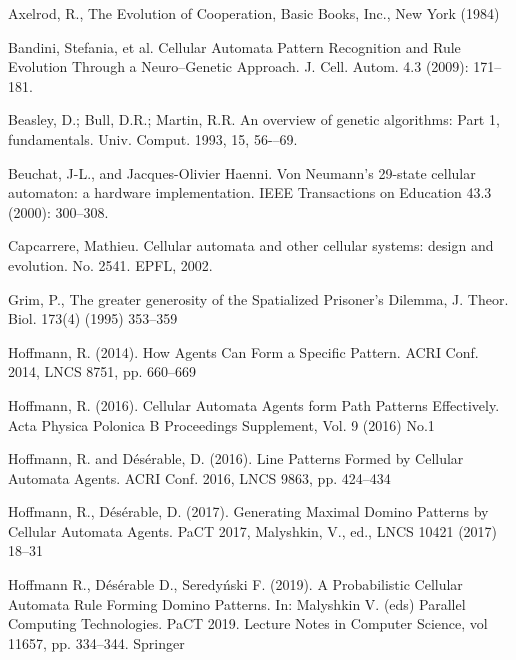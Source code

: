 \documentclass[10pt,a4paper]{article}  %
\begin{document}
\begin{thebibliography}{99}
\footnotesize
{}
Axelrod, R., The Evolution of Cooperation, Basic Books, Inc., New York (1984)

Bandini, Stefania, et al. 
Cellular Automata Pattern Recognition and Rule Evolution Through a Neuro--Genetic Approach.
J. Cell. Autom. 4.3 (2009): 171--181.


Beasley, D.; Bull, D.R.; Martin, R.R. An overview of genetic algorithms: Part 1, fundamentals. Univ. Comput. 1993, 15, 56-–69.

Beuchat, J-L., and Jacques-Olivier Haenni. 
Von Neumann's 29-state cellular automaton: a hardware implementation.
 IEEE Transactions on Education 43.3 (2000): 300--308.

Capcarrere, Mathieu. 
Cellular automata and other cellular systems: design and evolution. No. 2541. EPFL, 2002.

Grim, P., The greater generosity of the Spatialized Prisoner’s Dilemma, J. Theor.
Biol. 173(4) (1995) 353--359

Hoffmann, R. 
(2014).
How Agents Can Form a Specific Pattern.
ACRI Conf. 2014, LNCS 8751, pp. 660--669

Hoffmann, R. 
(2016).
Cellular Automata Agents form Path Patterns Effectively.
Acta Physica Polonica B Proceedings Supplement, Vol. 9 (2016) No.1


Hoffmann, R. and  D{\'e}s{\'e}rable, D.
(2016).
Line Patterns Formed by Cellular Automata Agents.
ACRI Conf. 2016, LNCS 9863, pp. 424--434

Hoffmann, R., D{\'e}s{\'e}rable, D.
(2017).
Generating Maximal Domino Patterns by Cellular Automata Agents. 
PaCT 2017, Malyshkin, V., ed., LNCS 10421 (2017) 18--31

Hoffmann R., Désérable D., Seredy\'{n}ski F. 
(2019).
 A Probabilistic Cellular Automata Rule Forming Domino Patterns. 
In: Malyshkin V. (eds) Parallel Computing Technologies. PaCT 2019. Lecture Notes in Computer Science, vol 11657, pp. 334--344. Springer


\end{thebibliography}
\end{document}
